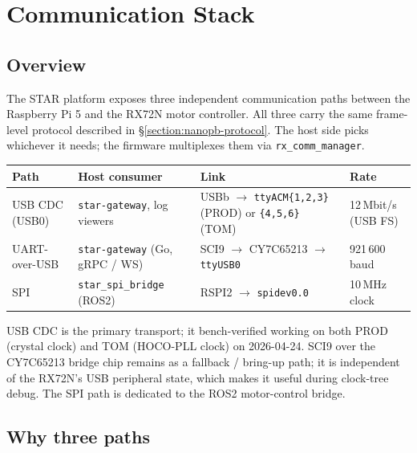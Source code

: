
\section{Communication Stack}
\label{section:communication-stack}

\subsection{Overview}

The STAR platform exposes three independent communication paths between
the Raspberry Pi 5 and the RX72N motor controller. All three carry the
same frame-level protocol described in
\S\ref{section:nanopb-protocol}. The host side picks whichever it
needs; the firmware multiplexes them via \texttt{rx\_comm\_manager}.

\begin{center}
\begin{tabular}{|l|l|l|l|}
\hline
\textbf{Path}      & \textbf{Host consumer}                & \textbf{Link}                                                & \textbf{Rate} \\
\hline
USB CDC (USB0)     & \texttt{star-gateway}, log viewers    & USBb $\rightarrow$ \texttt{ttyACM\{1,2,3\}} (PROD) or \texttt{\{4,5,6\}} (TOM) & 12\,Mbit/s (USB FS) \\
UART-over-USB      & \texttt{star-gateway} (Go, gRPC / WS) & SCI9 $\rightarrow$ CY7C65213 $\rightarrow$ \texttt{ttyUSB0}   & 921\,600 baud \\
SPI                & \texttt{star\_spi\_bridge} (ROS2)      & RSPI2 $\rightarrow$ \texttt{spidev0.0}                        & 10\,MHz clock \\
\hline
\end{tabular}
\end{center}

USB CDC is the primary transport; it bench-verified working on both PROD
(crystal clock) and TOM (HOCO-PLL clock) on 2026-04-24. SCI9 over the
CY7C65213 bridge chip remains as a fallback / bring-up path; it is
independent of the RX72N's USB peripheral state, which makes it useful
during clock-tree debug. The SPI path is dedicated to the ROS2
motor-control bridge.

\subsection{Why three paths}


